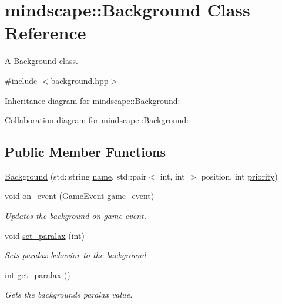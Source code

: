 \hypertarget{classmindscape_1_1_background}{}\section{mindscape\+:\+:Background Class Reference}
\label{classmindscape_1_1_background}


A \hyperlink{classmindscape_1_1_background}{Background} class.  




{\ttfamily \#include $<$background.\+hpp$>$}



Inheritance diagram for mindscape\+:\+:Background\+:


Collaboration diagram for mindscape\+:\+:Background\+:
\subsection*{Public Member Functions}
\begin{DoxyCompactItemize}
\item 
\hyperlink{classmindscape_1_1_background_a73e8e3561ad05c3228b67935376214dc}{Background} (std\+::string \hyperlink{classengine_1_1_game_object_a1f104f7af4f351e6d3278319762c9fe5}{name}, std\+::pair$<$ int, int $>$ position, int \hyperlink{classengine_1_1_game_object_a159ecaca30229e302793b11a75bd13c2}{priority})
\item 
void \hyperlink{classmindscape_1_1_background_af931f65e30c28af741c6e512138e6f50}{on\+\_\+event} (\hyperlink{class_game_event}{Game\+Event} game\+\_\+event)
\begin{DoxyCompactList}\small\item\em Updates the background on game event. \end{DoxyCompactList}\item 
void \hyperlink{classmindscape_1_1_background_aa60aa6d28e9a83b334c2be99a10fdcc2}{set\+\_\+paralax} (int)
\begin{DoxyCompactList}\small\item\em Sets paralax behavior to the background. \end{DoxyCompactList}\item 
int \hyperlink{classmindscape_1_1_background_ada0efcfe6ebdb54789a414bd884e696f}{get\+\_\+paralax} ()
\begin{DoxyCompactList}\small\item\em Gets the backgrounds\textquotesingle{} paralax value. \end{DoxyCompactList}\end{DoxyCompactItemize}
